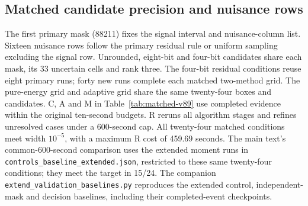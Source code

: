 \subsection{Matched candidate precision and nuisance rows}\label{app:precision-controls}
The first primary mask (88211) fixes the signal interval and nuisance-column list. Sixteen nuisance rows follow the primary residual rule or uniform sampling excluding the signal row. Unrounded, eight-bit and four-bit candidates share each mask, its 33 uncertain cells and rank three. The four-bit residual conditions reuse eight primary runs; forty new runs complete each matched two-method grid. The pure-energy grid and adaptive grid share the same twenty-four boxes and candidates. C, A and M in Table~\ref{tab:matched-v89} use completed evidence within the original ten-second budgets. R reruns all algorithm stages and refines unresolved cases under a 600-second cap. All twenty-four matched conditions meet width $10^{-5}$, with a maximum R cost of 459.69 seconds. The main text's common-600-second comparison uses the extended moment runs in \texttt{controls\_baseline\_extended.json}, restricted to these same twenty-four conditions; they meet the target in 15/24. The companion \texttt{extend\_validation\_baselines.py} reproduces the extended control, independent-mask and decision baselines, including their completed-event checkpoints.

